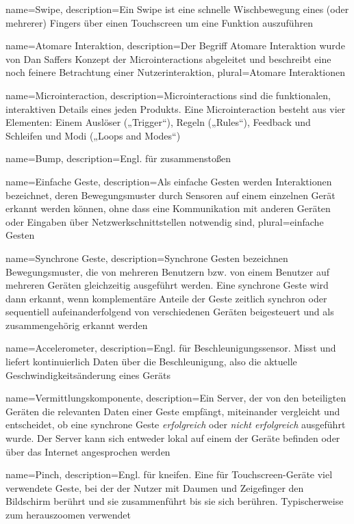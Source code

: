 {
    name=Swipe,
    description={Ein Swipe ist eine schnelle Wischbewegung eines (oder mehrerer) Fingers über einen Touchscreen um eine Funktion auszuführen}
}

{
    name=Atomare Interaktion,
    description={Der Begriff Atomare Interaktion wurde von Dan Saffers Konzept der Microinteractions abgeleitet und beschreibt eine noch feinere Betrachtung einer Nutzerinteraktion},
    plural={Atomare Interaktionen}
}

{
    name=Microinteraction,
    description={Microinteractions sind die funktionalen, interaktiven Details eines jeden Produkts. Eine Microinteraction besteht aus vier Elementen: Einem Auslöser („Trigger“), Regeln („Rules“), Feedback und Schleifen und Modi („Loops and Modes“)}
}

{
	name=Bump,
	description={Engl. für zusammenstoßen}
}

{
	name=Einfache Geste,
	description={Als einfache Gesten werden Interaktionen bezeichnet, deren Bewegungsmuster durch Sensoren auf einem einzelnen Gerät erkannt werden können, ohne dass eine Kommunikation mit anderen Geräten oder Eingaben über Netzwerkschnittstellen notwendig sind},
	plural={einfache Gesten}
}

{
	name=Synchrone Geste,
	description={Synchrone Gesten bezeichnen Bewegungsmuster, die von mehreren Benutzern bzw. von einem Benutzer auf mehreren Geräten gleichzeitig ausgeführt werden. Eine synchrone Geste wird dann erkannt, wenn komplementäre Anteile der Geste zeitlich synchron oder sequentiell aufeinanderfolgend von verschiedenen Geräten beigesteuert und als zusammengehörig erkannt werden \citep{Hinckley2003}}
}

{
	name=Accelerometer,
	description={Engl. für Beschleunigungssensor. Misst und liefert kontinuierlich Daten über die Beschleunigung, also die aktuelle Geschwindigkeitsänderung eines Geräts}
}

{
	name=Vermittlungskomponente,
	description={Ein Server, der von den beteiligten Geräten die relevanten Daten einer Geste empfängt, miteinander vergleicht und entscheidet, ob eine synchrone Geste \textit{erfolgreich} oder \textit{nicht erfolgreich} ausgeführt wurde. Der Server kann sich entweder lokal auf einem der Geräte befinden oder über das Internet angesprochen werden}
}

{
	name=Pinch,
	description={Engl. für kneifen. Eine für Touchscreen-Geräte viel verwendete Geste, bei der der Nutzer mit Daumen und Zeigefinger den Bildschirm berührt und sie zusammenführt bis sie sich berühren. Typischerweise zum herauszoomen verwendet}
}